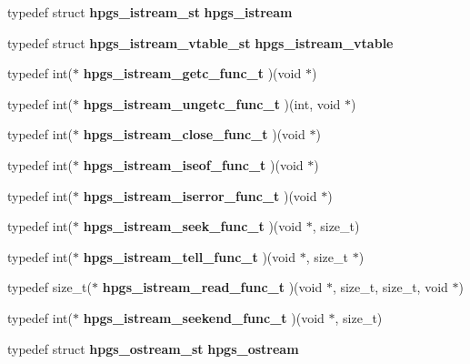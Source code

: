 \begin{DoxyCompactItemize}
\item 
typedef struct {\bf hpgs\_\-istream\_\-st} {\bfseries hpgs\_\-istream}\label{group__base_gab25ff4e14eb9bdcca226366b3706db25}

\item 
typedef struct {\bf hpgs\_\-istream\_\-vtable\_\-st} {\bfseries hpgs\_\-istream\_\-vtable}\label{group__base_gaba260b5c9250efc155ac0110287bb979}

\item 
typedef int($\ast$ {\bfseries hpgs\_\-istream\_\-getc\_\-func\_\-t} )(void $\ast$)\label{group__base_ga37dd7ea28f1d328d1ea5281f425b2f3b}

\item 
typedef int($\ast$ {\bfseries hpgs\_\-istream\_\-ungetc\_\-func\_\-t} )(int, void $\ast$)\label{group__base_ga6f547af6fefa0a7dcd8cf68f27e2691a}

\item 
typedef int($\ast$ {\bfseries hpgs\_\-istream\_\-close\_\-func\_\-t} )(void $\ast$)\label{group__base_ga4b32300990917abe2f30daa66677c803}

\item 
typedef int($\ast$ {\bfseries hpgs\_\-istream\_\-iseof\_\-func\_\-t} )(void $\ast$)\label{group__base_ga4ae8f88a9c6dd4477034e97034a1020c}

\item 
typedef int($\ast$ {\bfseries hpgs\_\-istream\_\-iserror\_\-func\_\-t} )(void $\ast$)\label{group__base_ga9300e5b3f98786a7c377b56bd04de348}

\item 
typedef int($\ast$ {\bfseries hpgs\_\-istream\_\-seek\_\-func\_\-t} )(void $\ast$, size\_\-t)\label{group__base_ga9a77b5f808d21c733cbf7a1f869824f9}

\item 
typedef int($\ast$ {\bfseries hpgs\_\-istream\_\-tell\_\-func\_\-t} )(void $\ast$, size\_\-t $\ast$)\label{group__base_ga6ae96c4a5b1f83c1dbd93e09f5855b60}

\item 
typedef size\_\-t($\ast$ {\bfseries hpgs\_\-istream\_\-read\_\-func\_\-t} )(void $\ast$, size\_\-t, size\_\-t, void $\ast$)\label{group__base_gabc43b203b3772c3f03c6b54019146a7b}

\item 
typedef int($\ast$ {\bfseries hpgs\_\-istream\_\-seekend\_\-func\_\-t} )(void $\ast$, size\_\-t)\label{group__base_gaf288d6ec93cc5e6c446ff1f8c1800a73}

\item 
typedef struct {\bf hpgs\_\-ostream\_\-st} {\bfseries hpgs\_\-ostream}\label{group__base_gad6d11d1839853862992558a3e2d8cfc7}


\end{DoxyCompactItemize}
